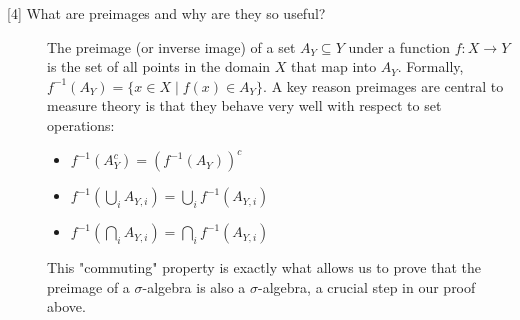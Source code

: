 \documentclass[11pt,a4paper]{article}
\theoremstyle{exercise_style}
\theoremstyle{definition}
\begin{document}
\begin{description}
    \item[\hypertarget{concept:preimage}{[4] What are preimages and why are they so useful?}] The preimage (or inverse image) of a set $A_Y \subseteq Y$ under a function $f: X \to Y$ is the set of all points in the domain $X$ that map into $A_Y$. Formally, $f^{-1}(A_Y) = \{x \in X \mid f(x) \in A_Y\}$. A key reason preimages are central to measure theory is that they behave very well with respect to set operations:
    \begin{itemize}
        \item $f^{-1}(A_Y^c) = (f^{-1}(A_Y))^c$
        \item $f^{-1}(\bigcup_i A_{Y,i}) = \bigcup_i f^{-1}(A_{Y,i})$
        \item $f^{-1}(\bigcap_i A_{Y,i}) = \bigcap_i f^{-1}(A_{Y,i})$
    \end{itemize}
    This "commuting" property is exactly what allows us to prove that the preimage of a $\sigma$-algebra is also a $\sigma$-algebra, a crucial step in our proof above.
\end{description}
\end{document}
